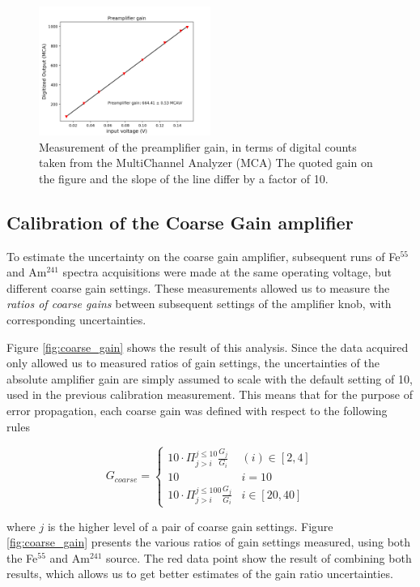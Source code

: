 \begin{figure}[H]
  \includegraphics[scale=0.5,width=0.5\textwidth]{graphics/preamp_gain_calibration_plus_conversionfactor.png}
  \caption{Measurement of the preamplifier gain, in terms of digital counts taken from the MultiChannel Analyzer (MCA) The quoted gain on the figure and the slope of the line differ by a factor of 10.}
  \label{fig:preamp_gain_mca}
\end{figure}


\subsection{Calibration of the Coarse Gain amplifier}
\label{sec:coarse}
To estimate the uncertainty on the coarse gain amplifier, subsequent runs of Fe$^{55}$ and Am$^{241}$ spectra acquisitions were made at the same operating voltage, but different coarse gain settings. These measurements allowed us to measure the \textit{ratios of coarse gains} between subsequent settings of the amplifier knob, with corresponding uncertainties.

Figure \ref{fig:coarse_gain} shows the result of this analysis. Since the data acquired only allowed us to measured ratios of gain settings, the uncertainties of the absolute amplifier gain are simply assumed to scale with the default setting of 10, used in the previous calibration measurement. This means that for the purpose of error propagation, each coarse gain was defined with respect to the following rules

$$
G_{coarse} = \left\{
\begin{array}{ll} 
  10\cdot\Pi_{j>i}^{j\leq10}\frac{G_{j}}{G_{i}} & (i) \in [2,4] \\
  10 & i=10 \\
  10\cdot\Pi_{j>i}^{j\leq 100}\frac{G_{j}}{G_{i}} & i \in [20,40] 
\end{array}
\right.
$$

where $j$ is the higher level of a pair of coarse gain settings. Figure \ref{fig:coarse_gain} presents the various ratios of gain settings measured, using both the Fe$^{55}$ and Am$^{241}$ source. The red data point show the result of combining both results, which allows us to get better estimates of the gain ratio uncertainties.

